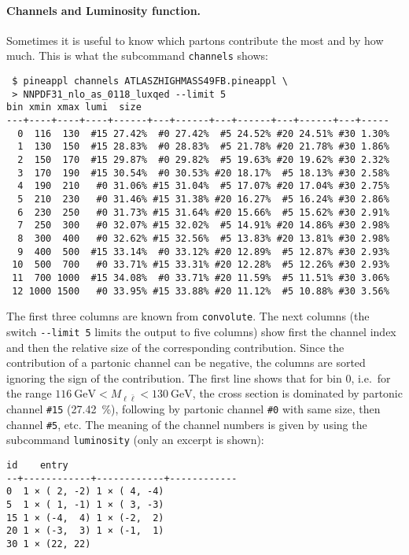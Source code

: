 \paragraph{Channels and Luminosity function.}
Sometimes it is useful to know which partons contribute the most and by how much.
This is what the subcommand \texttt{channels} shows:
\begin{verbatim}
 $ pineappl channels ATLASZHIGHMASS49FB.pineappl \
 > NNPDF31_nlo_as_0118_luxqed --limit 5
bin xmin xmax lumi  size
---+----+----+----+------+---+------+---+------+---+------+---+-----
  0  116  130  #15 27.42%  #0 27.42%  #5 24.52% #20 24.51% #30 1.30%
  1  130  150  #15 28.83%  #0 28.83%  #5 21.78% #20 21.78% #30 1.86%
  2  150  170  #15 29.87%  #0 29.82%  #5 19.63% #20 19.62% #30 2.32%
  3  170  190  #15 30.54%  #0 30.53% #20 18.17%  #5 18.13% #30 2.58%
  4  190  210   #0 31.06% #15 31.04%  #5 17.07% #20 17.04% #30 2.75%
  5  210  230   #0 31.46% #15 31.38% #20 16.27%  #5 16.24% #30 2.86%
  6  230  250   #0 31.73% #15 31.64% #20 15.66%  #5 15.62% #30 2.91%
  7  250  300   #0 32.07% #15 32.02%  #5 14.91% #20 14.86% #30 2.98%
  8  300  400   #0 32.62% #15 32.56%  #5 13.83% #20 13.81% #30 2.98%
  9  400  500  #15 33.14%  #0 33.12% #20 12.89%  #5 12.87% #30 2.93%
 10  500  700   #0 33.71% #15 33.31% #20 12.28%  #5 12.26% #30 2.93%
 11  700 1000  #15 34.08%  #0 33.71% #20 11.59%  #5 11.51% #30 3.06%
 12 1000 1500   #0 33.95% #15 33.88% #20 11.12%  #5 10.88% #30 3.56%
\end{verbatim}
The first three columns are known from \texttt{convolute}.
The next columns (the switch \texttt{-{}-limit 5} limits the output to five columns) show first the channel index and then the relative size of the corresponding contribution.
Since the contribution of a partonic channel can be negative, the columns are sorted ignoring the sign of the contribution.
The first line shows that for bin 0, i.e.\ for the range $\SI{116}{\giga\electronvolt} < M_{\ell \bar{\ell}} < \SI{130}{\giga\electronvolt}$, the cross section is dominated by partonic channel \texttt{\#15} (\SI{27.42}{\percent}), following by partonic channel \texttt{\#0} with same size, then channel \texttt{\#5}, etc.
The meaning of the channel numbers is given by using the subcommand \texttt{luminosity} (only an excerpt is shown):
\begin{verbatim}
id    entry
--+------------+------------+------------
0  1 × ( 2, -2) 1 × ( 4, -4)
5  1 × ( 1, -1) 1 × ( 3, -3)
15 1 × (-4,  4) 1 × (-2,  2)
20 1 × (-3,  3) 1 × (-1,  1)
30 1 × (22, 22)
\end{verbatim}
